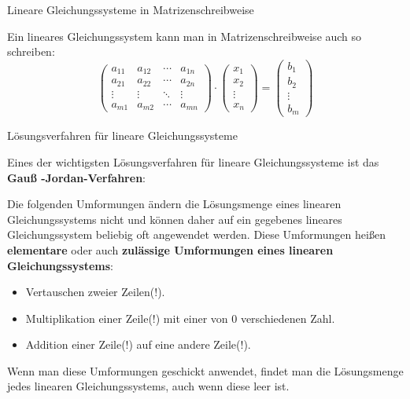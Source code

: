 \begin{frame}{Lineare Gleichungssysteme in Matrizenschreibweise}
\begin{bemerkung}
	Ein lineares Gleichungssystem kann man in Matrizenschreibweise auch so schreiben:
	\[
	\begin{pmatrix}
	a_{11} & a_{12}  & \cdots & a_{1n} \\
	a_{21} & a_{22}  & \cdots & a_{2n} \\
	\vdots & \vdots   & \ddots & \vdots \\
	a_{m1} & a_{m2}  & \cdots & a_{mn}
	\end{pmatrix} \cdot \begin{pmatrix}
	x_1 \\ x_2 \\ \vdots \\ x_n
	\end{pmatrix} = \begin{pmatrix}
	b_1 \\ b_2 \\ \vdots \\ b_m
	\end{pmatrix}
	\]
\end{bemerkung}
\end{frame}

\begin{frame}{Lösungsverfahren für lineare Gleichungssysteme}
	\begin{bemerkung}
		Eines der wichtigsten Lösungsverfahren für lineare Gleichungssysteme ist das \textbf{Gauß -Jordan-Verfahren}:
		
		Die folgenden Umformungen ändern die Lösungsmenge eines linearen Gleichungssystems nicht und können daher auf ein gegebenes lineares Gleichungssystem beliebig oft angewendet werden. Diese Umformungen heißen \textbf{elementare} oder auch \textbf{zulässige Umformungen eines linearen Gleichungssystems}:
		\begin{itemize}
			\item Vertauschen zweier Zeilen(!).
			\item Multiplikation einer Zeile(!) mit einer von 0 verschiedenen Zahl.
			\item Addition einer Zeile(!) auf eine andere Zeile(!).
		\end{itemize}
		Wenn man diese Umformungen geschickt anwendet, findet man die Lösungsmenge jedes linearen Gleichungssystems, auch wenn diese leer ist.
	\end{bemerkung}
\end{frame}

